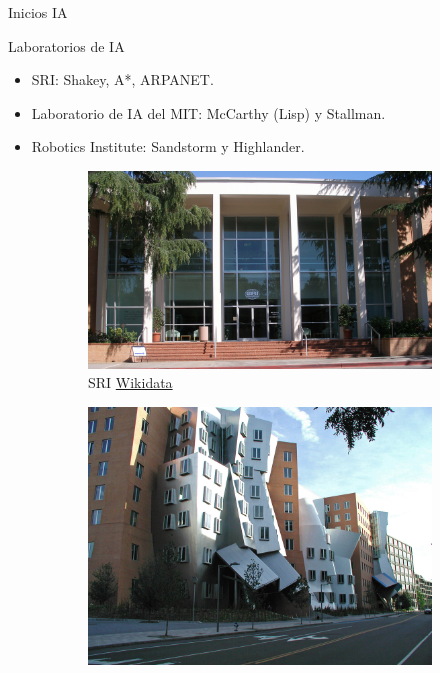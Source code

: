 \begin{frame}[fragile]{Inicios IA}
	\vspace{10px}
	\pause
	\begin{block}{Laboratorios de IA}
		\begin{itemize}
			\item SRI: Shakey, A*, ARPANET.
			\pause
			\item Laboratorio de IA del MIT: McCarthy (Lisp) y Stallman.
			\pause
			\item Robotics Institute: Sandstorm y Highlander.
		\end{itemize}
	\end{block}
	\begin{figure}
		\centering
		\pause
		\begin{subfigure}{0.33\textwidth}
			\centering
			\includegraphics[scale=0.038]{./EtapaModerna/Imagenes/sri.jpg}
			\caption{SRI \href{https://es.m.wikipedia.org/wiki/Archivo:SRI_International_HQ.jpg}{Wikidata}}
		\end{subfigure}
		\pause
		\begin{subfigure}{0.32\textwidth}
			\centering
			\includegraphics[scale=0.04]{./EtapaModerna/Imagenes/mit_ai.jpg}

\end{subfigure}
\end{figure}
\end{frame}
